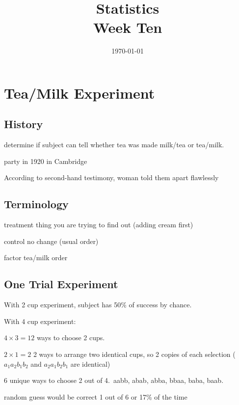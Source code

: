 \documentclass[landscape]{exam}
\title{Statistics \\ Week Ten}
\date{\today}
\author{}
\begin{document}
  \maketitle
  \tableofcontents

  \section{Tea/Milk Experiment}

  \subsection{History}
  \begin{itemize*}
    \item determine if subject can tell whether tea was made milk/tea or tea/milk.
    \item party in 1920 in Cambridge
    \item According to second-hand testimony, woman told them apart flawlessly
  \end{itemize*}

  \subsection{Terminology}
  \begin{description*}
    \item[treatment] thing you are trying to find out (adding cream first)
    \item[control] no change (usual order)
    \item[factor] tea/milk order
  \end{description*}

  \subsection{One Trial Experiment}
  With 2 cup experiment, subject has 50\% of success by chance.

  With 4 cup experiment:
  \begin{itemize*}
    \item $4 \times 3 = 12$ ways to choose 2 cups.  

    \item $2 \times 1 = 2$ 2 ways to arrange two identical cups, so 2 copies of
      each selection ($a_1a_2b_1b_2$ and $a_2a_1b_2b_1$ are identical)

    \item 6 unique ways to choose 2 out of 4.\ aabb, abab, abba, bbaa,
      baba, baab.

    \item random guess would be correct 1 out of 6 or 17\% of the time
  \end{itemize*}
\end{document}
